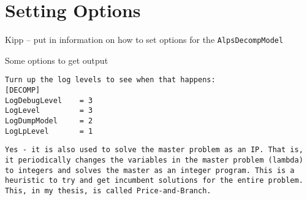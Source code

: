 \documentclass[11pt]{article}
\begin{document}
\section{Setting Options}

Kipp -- put in information on how to set options for the {\tt AlpsDecompModel}


Some options to get output

\begin{verbatim}
Turn up the log levels to see when that happens:
[DECOMP]
LogDebugLevel    = 3
LogLevel         = 3
LogDumpModel     = 2
LogLpLevel       = 1
\end{verbatim}


\begin{verbatim}
Yes - it is also used to solve the master problem as an IP. That is, it periodically changes the variables in the master problem (lambda) to integers and solves the master as an integer program. This is a heuristic to try and get incumbent solutions for the entire problem. This, in my thesis, is called Price-and-Branch.
\end{verbatim}
\end{document}
